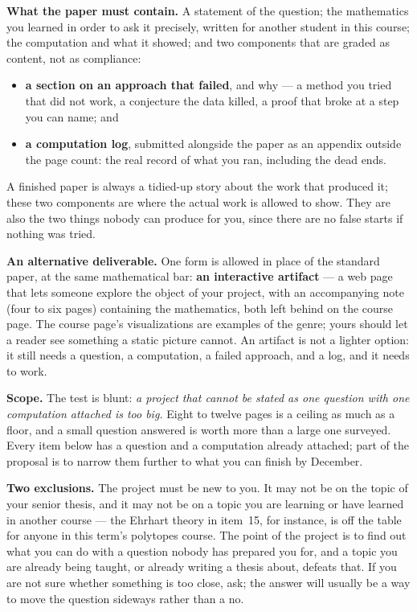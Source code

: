 \documentclass[11pt]{amsart}
\begin{document}
\medskip\noindent\textbf{What the paper must contain.} A statement of the question; the
mathematics you learned in order to ask it precisely, written for another student in this
course; the computation and what it showed; and two components that are graded as content,
not as compliance:
\begin{itemize}
\item \textbf{a section on an approach that failed}, and why --- a method you tried that did
not work, a conjecture the data killed, a proof that broke at a step you can name; and
\item \textbf{a computation log}, submitted alongside the paper as an appendix outside the page
count: the real record of what you ran, including the dead ends.
\end{itemize}
A finished paper is always a tidied-up story about the work that produced it; these two
components are where the actual work is allowed to show. They are also the two things nobody
can produce for you, since there are no false starts if nothing was tried.

\medskip\noindent\textbf{An alternative deliverable.} One form is allowed in place of the
standard paper, at the same mathematical bar: \textbf{an interactive artifact} --- a web page
that lets someone explore the object of your project, with an accompanying note (four to six
pages) containing the mathematics, both left behind on the course page. The course page's
visualizations are examples of the genre; yours should let a reader see something a static
picture cannot. An artifact is not a lighter option: it still needs a question, a computation,
a failed approach, and a log, and it needs to work.

\medskip\noindent\textbf{Scope.} The test is blunt: \emph{a project that cannot be stated as
one question with one computation attached is too big.} Eight to twelve pages is a ceiling as
much as a floor, and a small question answered is worth more than a large one surveyed. Every
item below has a question and a computation already attached; part of the proposal is to
narrow them further to what you can finish by December.

\medskip\noindent\textbf{Two exclusions.} The project must be new to you. It may not be on
the topic of your senior thesis, and it may not be on a topic you are learning or have learned
in another course --- the Ehrhart theory in item~15, for instance, is off the table for anyone
in this term's polytopes course. The point of the project is to find out what you can do with
a question nobody has prepared you for, and a topic you are already being taught, or already
writing a thesis about, defeats that. If you are not sure whether something is too close,
ask; the answer will usually be a way to move the question sideways rather than a no.
\end{document}
